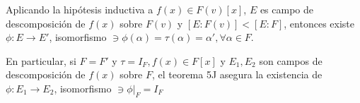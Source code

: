\begin{teorema}
\begin{dem}
\begin{enumerate}
            Aplicando la hipótesis inductiva a $f(x)\in F(v)[x]$, $E$ es campo de descomposición de $f(x)$ sobre $F(v)$ y $[E:F(v)]<[E:F]$, entonces existe $\phi:E\to E'$, isomorfismo $\ni\phi(\alpha)=\tau(\alpha)=\alpha',\forall\alpha \in F$. 
        \end{enumerate}
    \end{dem}
\end{teorema}

\begin{cajita}
    \begin{nota}
        En particular, si $F=F'$ y $\tau=I_F,f(x)\in F[x]$ y $E_1,E_2$ son campos de descomposición de $f(x)$ sobre $F$, el teorema 5J asegura la existencia de $\phi:E_1\to E_2$, isomorfismo $\ni \phi|_F=I_F$
    \end{nota}
\end{cajita}